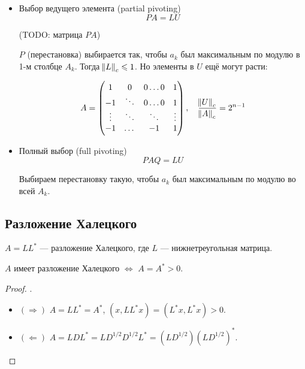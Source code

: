 \begin{itemize}
    \item Выбор ведущего элемента (partial pivoting)
        \[
            P A = L U
        \]

        (TODO: матрица $P A$)

        $P$ (перестановка) выбирается так, чтобы $a_k$ был максимальным по
        модулю в 1-м столбце $A_k$. Тогда $\norm{L}_c \leqslant 1$. Но элементы в $U$
        ещё могут расти:

        \[
            A = \begin{pmatrix}
                1 & 0 & 0 \dots 0 & 1 \\
                -1 & \ddots & 0 \dots 0 & 1 \\
                \vdots & \ddots & \ddots & \vdots \\
                -1 & \dots & -1 & 1
            \end{pmatrix},
            \quad \frac{\norm{U}_c}{\norm{A}_c} = 2^{n - 1}
        \]

    \item Полный выбор (full pivoting)
        \[
            P A Q = L U
        \]

        Выбираем перестановку такую, чтобы $a_k$ был максимальным по модулю во
        всей $A_k$.
\end{itemize}

\subsection{Разложение Халецкого}

\begin{definition}
    $A = L L^*$ --- разложение Халецкого, где $L$ --- нижнетреугольная матрица.
\end{definition}

\begin{theorem}
    $A$ имеет разложение Халецкого $\Leftrightarrow$ $A = A^* > 0$.
\end{theorem}

\begin{proof} .
    \begin{itemize}
        \item $(\Rightarrow)$ $A = L L^* = A^*$,
            $(x, L L^* x) = (L^* x, L^* x) > 0$.
        \item $(\Leftarrow)$
            $A = L D L^* = L D^{1/2} D^{1/2} L^* = (L D^{1/2}) (L D^{1/2})^*$.
    \end{itemize}
\end{proof}

